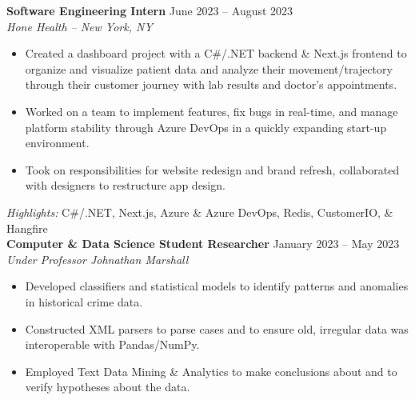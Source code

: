 \documentclass{article}
\begin{document}

\begin{adjustwidth}{1em}{1em}

    \textbf{Software Engineering Intern} \hfill June 2023 -- August 2023 \\
    \textit{Hone Health -- New York, NY}
    \begin{itemize}
        \item Created a dashboard project with a C\#/.NET backend \& Next.js frontend to organize and visualize patient data and analyze their movement/trajectory through their customer journey with lab results and doctor's appointments.
        \item Worked on a team to implement features, fix bugs in real-time, and manage platform stability through Azure DevOps in a quickly expanding start-up environment.
        \item Took on responsibilities for website redesign and brand refresh, collaborated with designers to restructure app design.
    \end{itemize}
    \textit{Highlights:} C\#/.NET, Next.js, Azure \& Azure DevOps, Redis, CustomerIO, \& Hangfire \\


    \textbf{Computer \& Data Science Student Researcher} \hfill January 2023 -- May 2023 \\
    \textit{Under Professor Johnathan Marshall}
    \begin{itemize}
        \item Developed classifiers and statistical models to identify patterns and anomalies in historical crime data.
        \item Constructed XML parsers to parse cases and to ensure old, irregular data was interoperable with Pandas/NumPy.
        \item Employed Text Data Mining \& Analytics to make conclusions about and to verify hypotheses about the data.
    \end{itemize}

    \vspace{1mm}

\end{adjustwidth}


\end{document}
